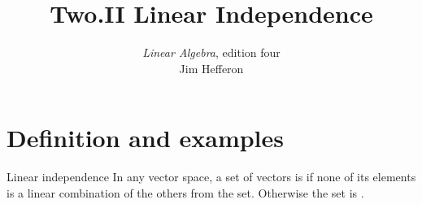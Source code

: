 \usepackage{linalgjh}
\usepackage{present}
\usepackage{directories}  %
\usepackage{xr} %
\usepackage{xr} %
\usepackage{catchfilebetweentags}
\usepackage{etoolbox} %
\makeatletter
\patchcmd{\CatchFBT@Fin@l}{\endlinechar\m@ne}{}
  {}{}
\makeatother

{
}
\hypersetup{colorlinks=true,linkcolor=blue} 

\title[Linear Independence] %
{Two.II Linear Independence}

\author{\textit{Linear Algebra}, edition four \\ {\small Jim Hef{}feron}}
\date{}


\subject{Linear Independence}


\begin{frame}
  \titlepage
\end{frame}




\section{Definition and examples}
\begin{frame}{Linear independence}
In any vector space, a set of vectors is
if none of its elements is a linear combination of the 
others from the set.
Otherwise the set is .

\pause\medskip
{}
\end{frame}



